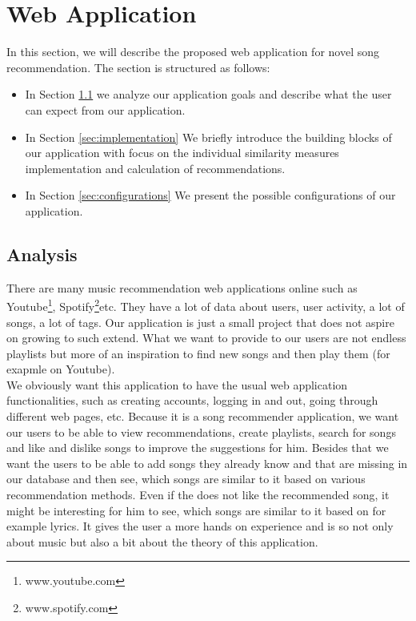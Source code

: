 \chapter{Web Application}\label{chap:web_app}

In this section, we will describe the proposed web application for novel song recommendation. The section is structured as follows: 
\begin{itemize}
    \item In Section \ref{sec:analysis} we analyze our application goals and describe what the user can expect from our application.
    \item In Section \ref{sec:implementation} We briefly introduce the building blocks of our application with focus on the individual similarity measures implementation and calculation of recommendations.
    \item In Section \ref{sec:configurations} We present the possible configurations of our application.
\end{itemize}

\section{Analysis}\label{sec:analysis}

There are many music recommendation web applications online such as Youtube\footnote{www.youtube.com}, Spotify\footnote{www.spotify.com}etc. They have a lot of data about users, user activity, a lot of songs, a lot of tags. Our application is just a small project that does not aspire on growing to such extend. What we want to provide to our users are not endless playlists but more of an inspiration to find new songs and then play them (for exapmle on Youtube). \\
We obviously want this application to have the usual web application functionalities, such as creating accounts, logging in and out, going through different web pages, etc. Because it is a song recommender application, we want our users to be able to view recommendations, create playlists, search for songs and like and dislike songs to improve the suggestions for him. Besides that we want the users to be able to add songs they already know and that are missing in our database and then see, which songs are similar to it based on various recommendation methods. Even if the does not like the recommended song, it might be interesting for him to see, which songs are similar to it based on for example lyrics. It gives the user a more hands on experience and is so not only about music but also a bit about the theory of this application. \\

